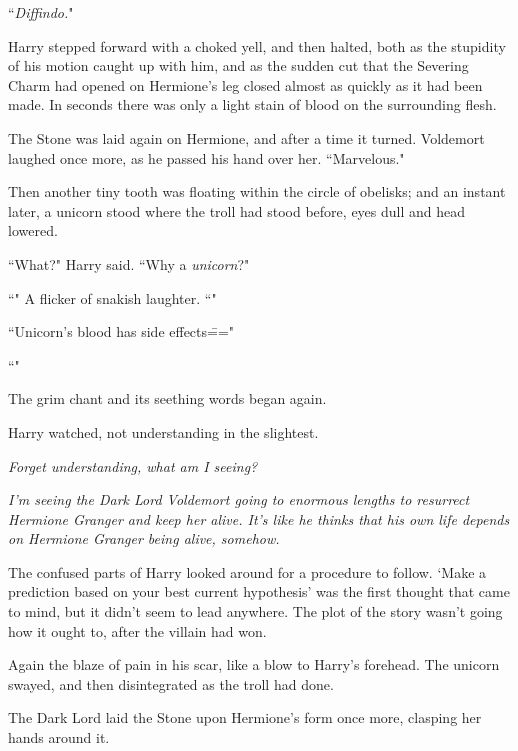 ``\emph{Diffindo.}"

Harry stepped forward with a choked yell, and then halted, both as the stupidity of his motion caught up with him, and as the sudden cut that the Severing Charm had opened on Hermione's leg closed almost as quickly as it had been made. In seconds there was only a light stain of blood on the surrounding flesh.

The Stone was laid again on Hermione, and after a time it turned. Voldemort laughed once more, as he passed his hand over her. ``Marvelous."

Then another tiny tooth was floating within the circle of obelisks; and an instant later, a unicorn stood where the troll had stood before, eyes dull and head lowered.

``What?" Harry said. ``Why a \emph{unicorn}?"

``" A flicker of snakish laughter. ``"

``Unicorn's blood has side effects\==="

``"

The grim chant and its seething words began again.

Harry watched, not understanding in the slightest.

\emph{Forget understanding, what am I seeing?}

\emph{I'm seeing the Dark Lord Voldemort going to enormous lengths to resurrect Hermione Granger and keep her alive. It's like he thinks that his own life depends on Hermione Granger being alive, somehow.}

The confused parts of Harry looked around for a procedure to follow. `Make a prediction based on your best current hypothesis' was the first thought that came to mind, but it didn't seem to lead anywhere. The plot of the story wasn't going how it ought to, after the villain had won.

Again the blaze of pain in his scar, like a blow to Harry's forehead. The unicorn swayed, and then disintegrated as the troll had done.

The Dark Lord laid the Stone upon Hermione's form once more, clasping her hands around it.

